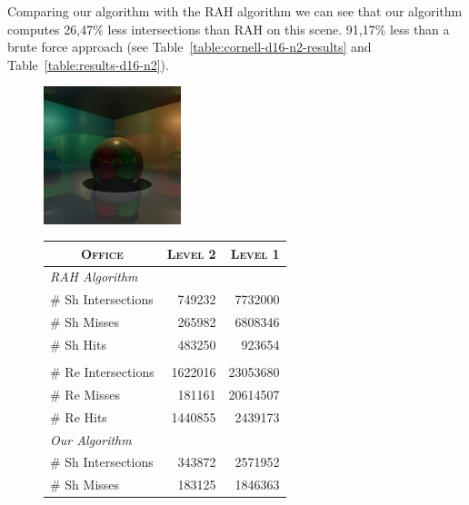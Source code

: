 Comparing our algorithm with the RAH algorithm we can see that our algorithm computes 26,47\% less intersections than RAH on this scene. 91,17\% less than a brute force approach (see Table~\ref{table:cornell-d16-n2-results} and Table~\ref{table:results-d16-n2}).


\begin{figure}[!htb]
    \begin{minipage}{0.25\linewidth}
        \centering
        \includegraphics[width=4.0cm]{Images/Cornell_Preview}
    \end{minipage}
    \begin{minipage}{0.725\linewidth}
        \centering
        \fontsize{8}{10}
        \selectfont
        \begin{tabular}[h]{l|rr}
            \multicolumn{1}{c|}{\textsc{Office}} & \textsc{Level 2} & \textsc{Level 1}\\
            \hline
            \emph{RAH Algorithm} & & \\
            \hline
            \quad \# Sh Intersections   & 749232    & 7732000	\\
            \quad \# Sh Misses          & 265982	& 6808346	\\
            \quad \# Sh Hits            & 483250	& 923654	\\
            & & \\
            \quad \# Re Intersections   & 1622016	& 23053680	\\
            \quad \# Re Misses          & 181161	& 20614507  \\
            \quad \# Re Hits            & 1440855	& 2439173   \\
            \hline
            \emph{Our Algorithm} & & \\
            \hline
            \quad \# Sh Intersections   & 343872    & 2571952	\\
            \quad \# Sh Misses          & 183125	& 1846363	\\

\end{tabular}
\end{minipage}
\end{figure}

